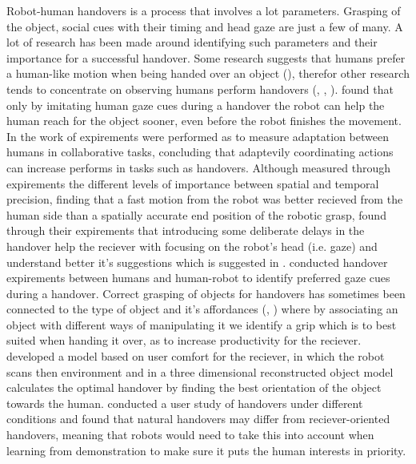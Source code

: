 Robot-human handovers is a process that involves a lot parameters. Grasping of the object, social cues with their timing and head gaze are just a few of many. A lot of research has been made around identifying such parameters and their importance for a successful handover. Some research suggests that humans prefer a human-like motion when being handed over an object (\parencite{}), therefor other research tends to concentrate on observing humans perform handovers (\parencite{Moon2014}, \parencite{Huang2015}, \parencite{Admoni2014}). \textcite{Moon2014} found that only by imitating human gaze cues during a handover the robot can help the human reach for the object sooner, even before the robot finishes the movement. In the work of \parencite{Huang2015} expirements were performed as to measure adaptation between humans in collaborative tasks, concluding that adaptevily coordinating actions can increase performs in tasks such as handovers. Although \textcite{Koene2014} measured through expirements the different levels of importance between spatial and temporal precision, finding that a fast motion from the robot was better recieved from the human side than a spatially accurate end position of the robotic grasp, \textcite{Admoni2014} found through their expirements that introducing some deliberate delays in the handover help the reciever with focusing on the robot's head (i.e. gaze) and understand better it's suggestions which is suggested in \parencite{Moon2014}. \textcite{Gharbi2015} conducted handover expirements between humans and human-robot to identify preferred gaze cues during a handover. Correct grasping of objects for handovers has sometimes been connected to the type of object and it's affordances (\parencite{Song2015}, \parencite{Chan2014}) where by associating an object with different ways of manipulating it we identify a grip which is to best suited when handing it over, as to increase productivity for the reciever. \textcite{Aleotti2012} developed a model based on user comfort for the reciever, in which the robot scans then environment and in a three dimensional reconstructed object model calculates the optimal handover by finding the best orientation of the object towards the human. \textcite{Chan2015} conducted a user study of handovers under different conditions and found that natural handovers may differ from reciever-oriented handovers, meaning that robots would need to take this into account when learning from demonstration to make sure it puts the human interests in priority.


